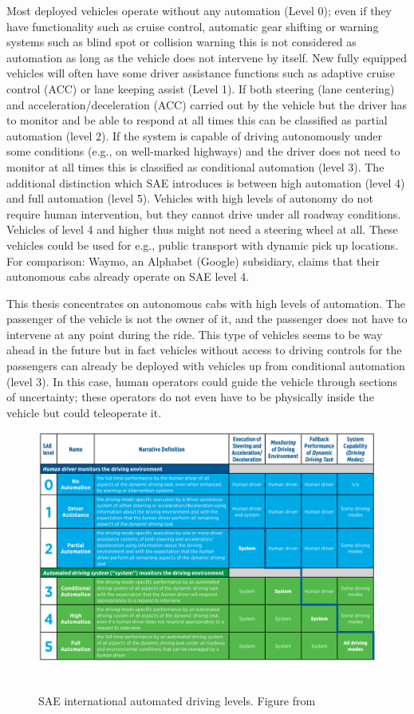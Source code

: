 Most deployed vehicles operate without any automation (Level 0); even if they have functionality such as cruise control, automatic gear shifting or warning systems such as blind spot or collision warning this is not considered as automation as long as the vehicle does not intervene by itself. 
New fully equipped vehicles will often have some driver assistance functions such as adaptive cruise control (ACC) or lane keeping assist (Level 1). If both steering (lane centering) and acceleration/deceleration (ACC) carried out by the vehicle but the driver has to monitor and be able to respond at all times this can be classified as partial automation (level 2). If the system is capable of driving autonomously under some conditions (e.g., on well-marked highways) and the driver does not need to monitor at all times this is classified as conditional automation (level 3). The additional distinction which SAE introduces is between high automation (level 4) and full automation (level 5). Vehicles with high levels of autonomy do not require human intervention, but they cannot drive under all roadway conditions. Vehicles of level 4 and higher thus might not need a steering wheel at all. These vehicles could be used for e.g., public transport with dynamic pick up locations. For comparison: Waymo, an Alphabet (Google) subsidiary, claims that their autonomous cabs already operate on SAE level 4\cite{Waymo2018DriverlessApplication}. 

This thesis concentrates on autonomous cabs with high levels of automation. The passenger of the vehicle is not the owner of it, and the passenger does not have to intervene at any point during the ride. This type of vehicles seems to be way ahead in the future but in fact vehicles without access to driving controls for the passengers can already be deployed with vehicles up from conditional automation (level 3). In this case, human operators could guide the vehicle through sections of uncertainty; these operators do not even have to be physically inside the vehicle but could teleoperate it\cite{Hollander2016TheSystems}.  

\begin{figure}
    \includegraphics[width=1\textwidth]{fig/SAE}\hfill\
    \caption[SAE international automated driving levels]{SAE international automated driving levels. Figure from \cite{SAEinternational2016}}
    \label{fig:SAE}
\end{figure}

